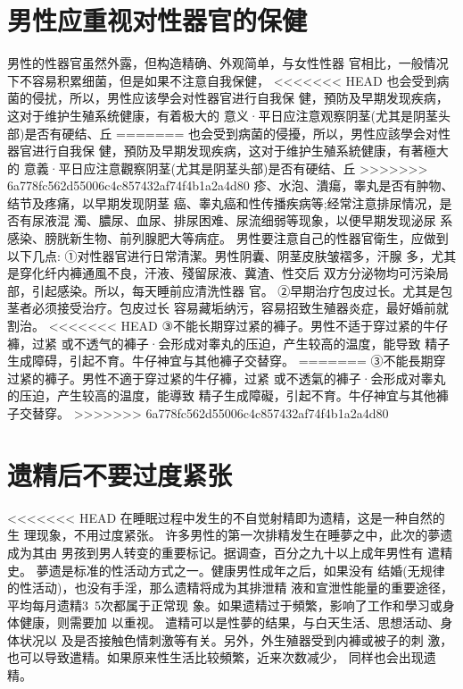 \documentclass[12pt,UTF8]{ctexbook}
\begin{document}
\section{男性应重视对性器官的保健}

男性的性器官虽然外露，但构造精确、外观简单，与女性性器
官相比，一般情况下不容易积累细菌，但是如果不注意自我保健，
<<<<<<< HEAD
也会受到病菌的侵扰，所以，男性应该學会对性器官进行自我保
健，預防及早期发现疾病，这对于维护生殖系统健康，有着极大的
意义·平日应注意观察阴茎(尤其是阴茎头部)是否有硬结、丘
=======
也会受到病菌的侵擾，所以，男性应該學会对性器官进行自我保
健，預防及早期发现疾病，这对于维护生殖系統健康，有著極大的
意義·平日应注意觀察阴茎(尤其是阴茎头部)是否有硬结、丘
>>>>>>> 6a778fc562d55006c4c857432af74f4b1a2a4d80
疹、水泡、潰瘍，睾丸是否有肿物、结节及疼痛，以早期发现阴茎
癌、睾丸癌和性传播疾病等;经常注意排尿情况，是否有尿液混
濁、膿尿、血尿、排尿困难、尿流细弱等现象，以便早期发现泌尿
系感染、膀胱新生物、前列腺肥大等病症。
男性要注意自己的性器官衛生，应做到以下几点:
①对性器官进行日常清潔。男性阴囊、阴茎皮肤皱褶多，汗腺
多，尤其是穿化纤内褲通風不良，汗液、殘留尿液、冀渣、性交后
双方分泌物均可污染局部，引起感染。所以，每天睡前应清洗性器
官。
②早期治疗包皮过长。尤其是包茎者必须接受治疗。包皮过长
容易藏垢纳污，容易招致生殖器炎症，最好婚前就割治。
<<<<<<< HEAD
③不能长期穿过紧的褲子。男性不适于穿过紧的牛仔褲，过紧
或不透气的褲子·会形成对睾丸的压迫，产生较高的温度，能导致
精子生成障碍，引起不育。牛仔神宜与其他褲子交替穿。
=======
③不能長期穿过紧的褲子。男性不適于穿过紧的牛仔褲，过紧
或不透氣的褲子·会形成对睾丸的压迫，产生较高的温度，能導致
精子生成障礙，引起不育。牛仔神宜与其他褲子交替穿。
>>>>>>> 6a778fc562d55006c4c857432af74f4b1a2a4d80

\section{遗精后不要过度紧张}

<<<<<<< HEAD
在睡眠过程中发生的不自觉射精即为遗精，这是一种自然的生
理现象，不用过度紧张。
许多男性的第一次排精发生在睡夢之中，此次的夢遗成为其由
男孩到男人转变的重要标记。据调查，百分之九十以上成年男性有
遣精史。
夢遗是标准的性活动方式之一。健康男性成年之后，如果没有
结婚(无规律的性活动)，也没有手淫，那么遗精将成为其排泄精
液和宣泄性能量的重要途径，平均每月遗精3~5次都属于正常现
象。如果遗精过于頻繁，影响了工作和學习或身体健康，则需要加
以重视。
遣精可以是性夢的结果，与白天生活、思想活动、身体状况以
及是否接触色情刺激等有关。另外，外生殖器受到内褲或被子的刺
激，也可以导致遣精。如果原来性生活比较頻繁，近来次数减少，
同样也会出现遗精。
\end{document}
